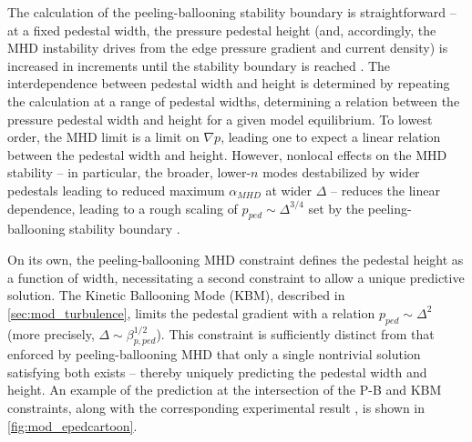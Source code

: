 The calculation of the peeling-ballooning stability boundary is straightforward -- at a fixed pedestal width, the pressure pedestal height (and, accordingly, the MHD instability drives from the edge pressure gradient and current density) is increased in increments until the stability boundary is reached \cite{Snyder2009}.  The interdependence between pedestal width and height is determined by repeating the calculation at a range of pedestal widths, determining a relation between the pressure pedestal width and height for a given model equilibrium.  To lowest order, the MHD limit is a limit on $\nabla p$, leading one to expect a linear relation between the pedestal width and height.  However, nonlocal effects on the MHD stability -- in particular, the broader, lower-$n$ modes destabilized by wider pedestals leading to reduced maximum $\alpha_{MHD}$ at wider $\Delta$ \cite{Snyder2003} -- reduces the linear dependence, leading to a rough scaling of $p_{ped} \sim \Delta^{3/4}$ set by the peeling-ballooning stability boundary \cite{Snyder2009a}.

On its own, the peeling-ballooning MHD constraint defines the pedestal height as a function of width, necessitating a second constraint to allow a unique predictive solution.  The Kinetic Ballooning Mode (KBM), described in \cref{sec:mod_turbulence}, limits the pedestal gradient with a relation $p_{ped} \sim \Delta^2$ (more precisely, $\Delta \sim \beta_{p,ped}^{1/2}$).  This constraint is sufficiently distinct from that enforced by peeling-ballooning MHD  that only a single nontrivial solution satisfying both exists -- thereby uniquely predicting the pedestal width and height.  An example of the prediction at the intersection of the P-B and KBM constraints, along with the corresponding experimental result \cite{Snyder2011}, is shown in \cref{fig:mod_epedcartoon}.

